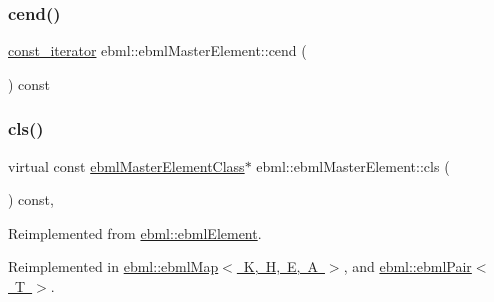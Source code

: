 \mbox{\label{classebml_1_1ebmlMasterElement_a7e4fa27c47c71e99615452dc4e1e3190}} 
\subsubsection{\texorpdfstring{cend()}{cend()}}
{\footnotesize\ttfamily \mbox{\hyperlink{classebml_1_1ebmlMasterElement_1_1const__iterator}{const\+\_\+iterator}} ebml\+::ebml\+Master\+Element\+::cend (\begin{DoxyParamCaption}{ }\end{DoxyParamCaption}) const}

\mbox{\label{classebml_1_1ebmlMasterElement_a4073fb3f7ce3dda153384821714df29e}} 
\subsubsection{\texorpdfstring{cls()}{cls()}}
{\footnotesize\ttfamily virtual const \mbox{\hyperlink{classebml_1_1ebmlMasterElementClass}{ebml\+Master\+Element\+Class}}$\ast$ ebml\+::ebml\+Master\+Element\+::cls (\begin{DoxyParamCaption}{ }\end{DoxyParamCaption}) const\hspace{0.3cm}{\ttfamily [protected]}, {\ttfamily [virtual]}}



Reimplemented from \mbox{\hyperlink{classebml_1_1ebmlElement_a15cf59e94b01e2c49ec96512b9bd9d90}{ebml\+::ebml\+Element}}.



Reimplemented in \mbox{\hyperlink{classebml_1_1ebmlMap_a44f835be40d70d8425b8e08fbe0ce77f}{ebml\+::ebml\+Map$<$ K, H, E, A $>$}}, and \mbox{\hyperlink{classebml_1_1ebmlPair_ad1244458e1390cbf567dfd460b0002f2}{ebml\+::ebml\+Pair$<$ T $>$}}.

\mbox{\label{classebml_1_1ebmlMasterElement_ae396f9a2f9e0e86b7f6d20505b88352c}} 
